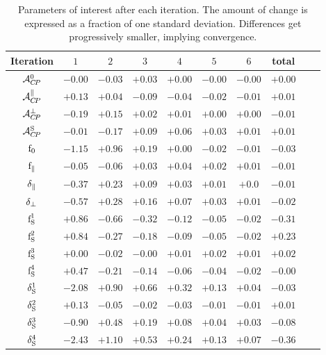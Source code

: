 \begin{table}[!t]
\centering
\footnotesize
\begin{tabular}{ c c c c c c c c c | c}
  \hline
  Iteration          &       $1$       &       $2$       &       $3$       &       $4$       &       $5$       &       $6$  & total\\
  \hline
  $\mathcal{A}_{C\!P}^{0}$                       &  $-0.00$  &  $-0.03$  &  $+0.03$  &  $+0.00$  &  $-0.00$  &  $-0.00$  &  $+0.00$    \\
  $\mathcal{A}_{C\!P}^{\parallel}$               &  $+0.13$  &  $+0.04$  &  $-0.09$  &  $-0.04$  &  $-0.02$  &  $-0.01$  &  $+0.01$    \\
  $\mathcal{A}_{C\!P}^{\perp}$                   &  $-0.19$  &  $+0.15$  &  $+0.02$  &  $+0.01$  &  $+0.00$  &  $+0.00$  &  $-0.01$    \\
  $\mathcal{A}_{C\!P}^{\text{S}}$                &  $-0.01$  &  $-0.17$  &  $+0.09$  &  $+0.06$  &  $+0.03$  &  $+0.01$  &  $+0.01$    \\
  \hline
  $\text{f}_{0}$                        &  $-1.15$  &  $+0.96$  &  $+0.19$  &  $+0.00$  &  $-0.02$  &  $-0.01$  &  $-0.03$    \\
  $\text{f}_{\parallel}$                &  $-0.05$  &  $-0.06$  &  $+0.03$  &  $+0.04$  &  $+0.02$  &  $+0.01$  &  $-0.01$    \\
  $\delta_{\parallel}$          &  $-0.37$  &  $+0.23$  &  $+0.09$  &  $+0.03$  &  $+0.01$  &  $+0.0 $  &  $-0.01$    \\
  $\delta_{\perp}$              &  $-0.57$  &  $+0.28$  &  $+0.16$  &  $+0.07$  &  $+0.03$  &  $+0.01$  &  $-0.02$    \\
  \hline
  $\text{f}_{\text{S}}^{1}$                        &  $+0.86$  &  $-0.66$  &  $-0.32$  &  $-0.12$  &  $-0.05$  &  $-0.02$  &  $-0.31$    \\
  $\text{f}_{\text{S}}^{2}$                        &  $+0.84$  &  $-0.27$  &  $-0.18$  &  $-0.09$  &  $-0.05$  &  $-0.02$  &  $+0.23$    \\
  $\text{f}_{\text{S}}^{3}$                        &  $+0.00$  &  $-0.02$  &  $-0.00$  &  $+0.01$  &  $+0.02$  &  $+0.01$  &  $+0.02$    \\
  $\text{f}_{\text{S}}^{4}$                        &  $+0.47$  &  $-0.21$  &  $-0.14$  &  $-0.06$  &  $-0.04$  &  $-0.02$  &  $-0.00$    \\
  $\delta_{\text{S}}^{1}$                    &  $-2.08$  &  $+0.90$  &  $+0.66$  &  $+0.32$  &  $+0.13$  &  $+0.04$  &  $-0.03$    \\
  $\delta_{\text{S}}^{2}$                    &  $+0.13$  &  $-0.05$  &  $-0.02$  &  $-0.03$  &  $-0.01$  &  $-0.01$  &  $+0.01$    \\
  $\delta_{\text{S}}^{3}$                    &  $-0.90$  &  $+0.48$  &  $+0.19$  &  $+0.08$  &  $+0.04$  &  $+0.03$  &  $-0.08$    \\
  $\delta_{\text{S}}^{4}$                    &  $-2.43$  &  $+1.10$  &  $+0.53$  &  $+0.24$  &  $+0.13$  &  $+0.07$  &  $-0.36$    \\
  \hline
\end{tabular}
\caption{Parameters of interest after each iteration. The amount of change is expressed as a fraction of one standard deviation.
         Differences get progressively smaller, implying convergence.}
\label{pars_convergence}
\end{table}

